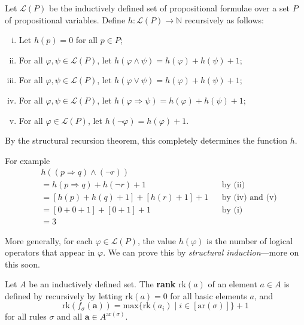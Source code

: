 \begin{example}
Let $\mathcal{L}(P)$ be the inductively defined set of propositional formulae over a set $P$ of propositional variables. Define $h : \mathcal{L}(P) \to \mathbb{N}$ recursively as follows:
\begin{enumerate}[(i)]
\item Let $h(p) = 0$ for all $p \in P$;
\item For all $\varphi, \psi \in \mathcal{L}(P)$, let $h(\varphi \wedge \psi) = h(\varphi) + h(\psi) + 1$;
\item For all $\varphi, \psi \in \mathcal{L}(P)$, let $h(\varphi \vee \psi) = h(\varphi) + h(\psi) + 1$;
\item For all $\varphi, \psi \in \mathcal{L}(P)$, let $h(\varphi \Rightarrow \psi) = h(\varphi) + h(\psi) + 1$;
\item For all $\varphi \in \mathcal{L}(P)$, let $h(\neg \varphi) = h(\varphi) + 1$.
\end{enumerate}
By the structural recursion theorem, this completely determines the function $h$.

For example
\begin{align*}
& h((p \Rightarrow q) \wedge (\neg r)) && \\
&= h(p \Rightarrow q) + h(\neg r) + 1 && \text{by (ii)} \\
&= [h(p) + h(q) + 1] + [h(r) + 1] + 1 && \text{by (iv) and (v)} \\
&= [0+0+1] + [0+1] + 1 && \text{by (i)} \\
&= 3
\end{align*}

More generally, for each $\varphi \in \mathcal{L}(P)$, the value $h(\varphi)$ is the number of logical operators that appear in $\varphi$. We can prove this by \textit{structural induction}---more on this soon.
\end{example}

\begin{definition}
\label{defRank}
Let $A$ be an inductively defined set. The \textbf{rank} $\mathrm{rk}(a)$  of an element $a \in A$ is defined by recursively by letting $\mathrm{rk}(a) = 0$ for all basic elements $a$, and
\[ \mathrm{rk}(f_{\sigma}(\mathbf{a})) = \mathrm{max} \{ \mathrm{rk}(a_i) \mid i \in [\mathrm{ar}(\sigma)] \} + 1 \]
for all rules $\sigma$ and all $\mathbf{a} \in A^{\mathrm{ar}(\sigma)}$.
\end{definition}

